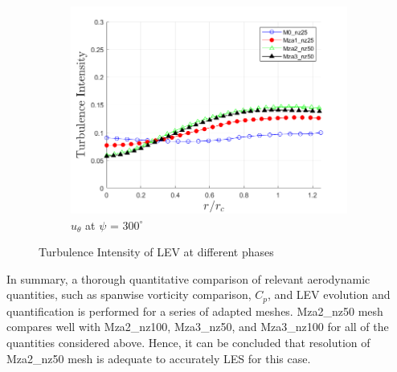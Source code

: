 \begin{figure}[H]
\begin{subfigure}[b]{0.475\textwidth}
		\centering
		\includegraphics[width=1\textwidth]{figures/zonal_adapt_results/LEV/u_theta/TI_phase_300.png}
		\caption{$u_\theta$ at $\psi$ = $300^\circ$}
		\label{fig:zonal_TI_300}
	\end{subfigure}
	\caption{ Turbulence Intensity of LEV at different phases}
	\label{fig:zonal_TI_plots_LEV}
\end{figure}

In summary, a thorough quantitative comparison of relevant aerodynamic quantities, such as spanwise vorticity comparison, $C_p$, and LEV evolution and quantification is performed for a series of adapted meshes. Mza2\_nz50 mesh compares well with Mza2\_nz100, Mza3\_nz50, and Mza3\_nz100 for all of the quantities considered above.
Hence, it can be concluded that resolution of Mza2\_nz50 mesh is adequate to accurately LES for this case.